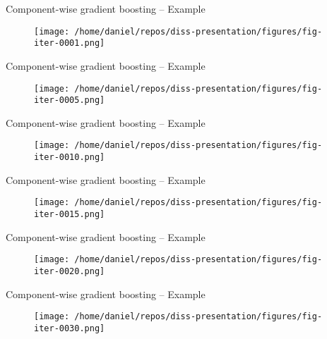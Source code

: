 
\begin{frame}{Component-wise gradient boosting -- Example}
	\begin{figure}
		\centering
		\texttt{[image: /home/daniel/repos/diss-presentation/figures/fig-iter-0001.png]}
	\end{figure}
	\addtocounter{framenumber}{0}
\end{frame}


\begin{frame}{Component-wise gradient boosting -- Example}
	\begin{figure}
		\centering
		\texttt{[image: /home/daniel/repos/diss-presentation/figures/fig-iter-0005.png]}
	\end{figure}
	\addtocounter{framenumber}{-1}
\end{frame}


\begin{frame}{Component-wise gradient boosting -- Example}
	\begin{figure}
		\centering
		\texttt{[image: /home/daniel/repos/diss-presentation/figures/fig-iter-0010.png]}
	\end{figure}
	\addtocounter{framenumber}{-1}
\end{frame}


\begin{frame}{Component-wise gradient boosting -- Example}
	\begin{figure}
		\centering
		\texttt{[image: /home/daniel/repos/diss-presentation/figures/fig-iter-0015.png]}
	\end{figure}
	\addtocounter{framenumber}{-1}
\end{frame}


\begin{frame}{Component-wise gradient boosting -- Example}
	\begin{figure}
		\centering
		\texttt{[image: /home/daniel/repos/diss-presentation/figures/fig-iter-0020.png]}
	\end{figure}
	\addtocounter{framenumber}{-1}
\end{frame}


\begin{frame}{Component-wise gradient boosting -- Example}
	\begin{figure}
		\centering
		\texttt{[image: /home/daniel/repos/diss-presentation/figures/fig-iter-0030.png]}
	\end{figure}
	\addtocounter{framenumber}{-1}
\end{frame}


